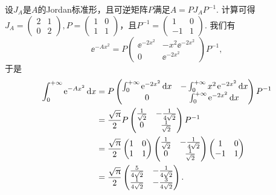 \begin{solution}
    设$J_A$是$A$的Jordan标准形，且可逆矩阵$P$满足$A=PJ_AP^{-1}$. 计算可得$J_A=\begin{pmatrix}
      2 & 1 \\
      0 & 2
    \end{pmatrix},P=\begin{pmatrix}
      1 & 0 \\
      1 & 1
    \end{pmatrix}$，且$P^{-1}=\begin{pmatrix}
      1 & 0 \\
      -1 & 1
    \end{pmatrix}$. 我们有
    \[
      \ee^{-Ax^2} = P \begin{pmatrix}
        \ee^{-2x^2} & -x^2\ee^{-2x^2} \\
        0 & \ee^{-2x^2}
      \end{pmatrix} P^{-1},
    \]
    于是
    \begin{align*}
      \int_0^{+\infty}\ee^{-Ax^2}\dif x & = P
      \begin{pmatrix}
        \int_0^{+\infty}\ee^{-2x^2}\dif x & -\int_0^{+\infty}x^2\ee^{-2x^2}\dif x \\
        0 & \int_0^{+\infty}\ee^{-2x^2}\dif x
      \end{pmatrix}P^{-1} \\
      & = \frac{\sqrt\pi}2P
      \begin{pmatrix}
        \frac1{\sqrt2} & - \frac1{4\sqrt2} \\
        0 & \frac1{\sqrt2}
      \end{pmatrix} P^{-1} \\
      & = \frac{\sqrt\pi}2
      \begin{pmatrix}
        1 & 0 \\
        1 & 1
      \end{pmatrix}
      \begin{pmatrix}
        \frac1{\sqrt2} & - \frac1{4\sqrt2} \\
        0 & \frac1{\sqrt2}
      \end{pmatrix} \begin{pmatrix}
        1 & 0 \\
        -1 & 1
      \end{pmatrix} \\
      & = \frac{\sqrt\pi}2
      \begin{pmatrix}
        \frac5{4\sqrt2} & - \frac1{4\sqrt2} \\
        \frac1{4\sqrt2} & - \frac3{4\sqrt2}
      \end{pmatrix}.
    \end{align*}


\end{solution}
